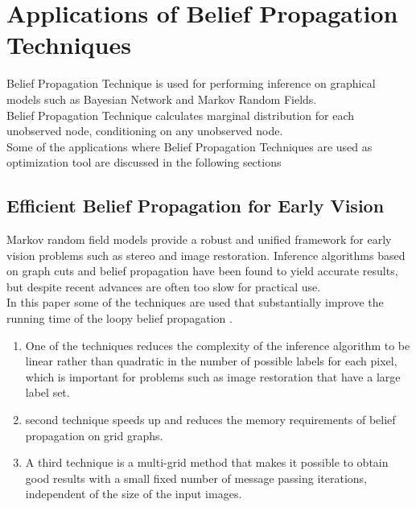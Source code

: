 \chapter{\textbf{Applications of Belief Propagation Techniques}}

Belief Propagation Technique is used for performing inference on graphical models such as Bayesian Network and Markov Random Fields.\\Belief Propagation Technique calculates marginal distribution for each unobserved node, conditioning on any unobserved node.\\Some of the applications where Belief Propagation Techniques are used as optimization tool are discussed in the following sections
\section{Efficient Belief Propagation for Early Vision}

Markov random field models provide a robust and unified framework for early vision problems such as stereo and image restoration. Inference algorithms based on graph cuts and belief propagation have been found to yield accurate results, but despite recent advances are often too slow for practical use.\\ In this paper some of the techniques  are used that substantially improve the running time of the loopy belief propagation .
\begin{enumerate}
  \item One of the techniques reduces the complexity of the inference algorithm to be linear rather than quadratic in the number of possible labels for each pixel, which is important for problems such as image restoration that have a large label set.
  \item second  technique speeds up and reduces the memory requirements of belief propagation on grid graphs.
  \item  A third technique is a multi-grid method that makes it possible to obtain good results with a small fixed number of message passing iterations, independent of the size of the input images.
\end{enumerate}


